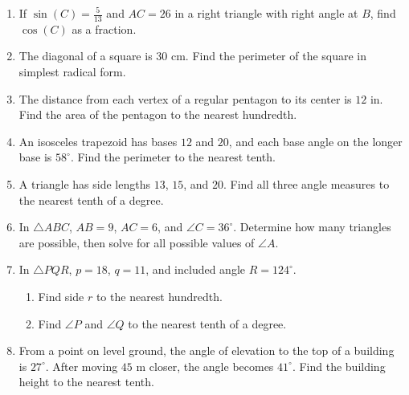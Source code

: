 \documentclass[12pt]{article}
\begin{document}
\begin{enumerate}[leftmargin=*, itemsep=1em]
  \item If $\sin(C)=\frac{5}{13}$ and $AC=26$ in a right triangle with right angle at $B$, find $\cos(C)$ as a fraction.

  \item The diagonal of a square is $30$ cm. Find the perimeter of the square in simplest radical form.

  \item The distance from each vertex of a regular pentagon to its center is $12$ in. Find the area of the pentagon to the nearest hundredth.

  \item An isosceles trapezoid has bases $12$ and $20$, and each base angle on the longer base is $58^\circ$. Find the perimeter to the nearest tenth.

  \item A triangle has side lengths $13$, $15$, and $20$. Find all three angle measures to the nearest tenth of a degree.

  \item In $\triangle ABC$, $AB=9$, $AC=6$, and $\angle C=36^\circ$. Determine how many triangles are possible, then solve for all possible values of $\angle A$.

  \item In $\triangle PQR$, $p=18$, $q=11$, and included angle $R=124^\circ$.
  \begin{enumerate}[label=\alph*)]
    \item Find side $r$ to the nearest hundredth.
    \item Find $\angle P$ and $\angle Q$ to the nearest tenth of a degree.
  \end{enumerate}

  \item From a point on level ground, the angle of elevation to the top of a building is $27^\circ$. After moving $45$ m closer, the angle becomes $41^\circ$. Find the building height to the nearest tenth.
\end{enumerate}

\newpage
\end{document}
